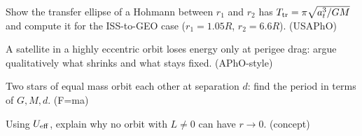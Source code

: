 \begin{exercise}[hard]
Show the transfer ellipse of a Hohmann between $r_1$ and $r_2$ has
$T_{\rm tr}=\pi\sqrt{a_t^{3}/GM}$ and compute it for the ISS-to-GEO
case ($r_1=1.05R$, $r_2=6.6R$). (USAPhO)
\end{exercise}
\begin{exercise}[hard]
A satellite in a highly eccentric orbit loses energy only at perigee
drag: argue qualitatively what shrinks and what stays fixed.
(APhO-style)
\end{exercise}
\begin{exercise}[medium]
Two stars of equal mass orbit each other at separation $d$: find the
period in terms of $G,M,d$. (F=ma)
\end{exercise}
\begin{exercise}[medium]
Using $U_{\rm eff}$, explain why no orbit with $L\ne0$ can have
$r\to0$. (concept)
\end{exercise}
